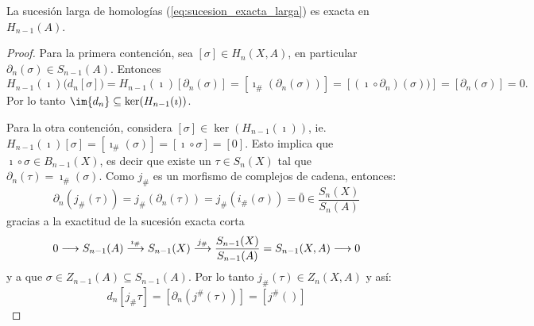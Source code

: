 \begin{ejercicio}\label{ej:66}
  La sucesi\'on larga de homolog\'ias (\ref{eq:sucesion_exacta_larga}) es exacta en $H_{n-1}(A)$.
\end{ejercicio}
\begin{proof}%
  Para la primera contenci\'on, sea $[\sigma]\in H_n(X,A)$, en particular $\partial_n(\sigma)\in S_{n-1}(A)$.
  Entonces
  \[
    H_{n-1}(\imath)\big( d_n[\sigma] \big)=
    H_{n-1}(\imath)[\partial_n(\sigma)]=
    [\imath_{\#}(\partial_n(\sigma))]=
    [(\imath\circ\partial_n)(\sigma))]=
    [\partial_n(\sigma)]=0.
  \]
  Por lo tanto $\im{d_n}\subseteq\ker(H_{n-1}(\imath))$.

  Para la otra contenci\'on, considera $[\sigma]\in\ker(H_{n-1}(\imath))$, ie.
  $H_{n-1}(\imath)[\sigma]=[\imath_{\#}(\sigma)]=[\imath\circ\sigma]=[0]$. Esto implica que $\imath\circ\sigma\in B_{n-1}(X)$,
  es decir que existe un $\tau\in S_n(X)$ tal que $\partial_n(\tau)=\imath_{\#}(\sigma)$. 
  Como $j_{\#}$ es un morfismo de complejos de cadena, entonces:
  \[
    \partial_n (j_{\#}(\tau))=j_{\#}(\partial_n(\tau))=j_{\#}(i_{\#}(\sigma))=\bar{0}\in\frac{S_n(X)}{S_n(A)}
  \]
  gracias a la exactitud de la sucesi\'on exacta corta
  \[
    0 \longrightarrow S_{n-1}(A) \overset{\imath_{\#}}{\longrightarrow} S_{n-1}(X) \overset{j_{\#}}{\longrightarrow} \frac{S_{n-1}(X)}{S_{n-1}(A)}=S_{n-1}(X,A) \longrightarrow 0
  \]
  y a que $\sigma\in Z_{n-1}(A)\subseteq S_{n-1}(A)$. Por lo tanto $j_{\#}(\tau)\in Z_n(X,A)$ y as\'i:
  \[
    d_n[j_{\#}\tau]=[\partial_n(j^{\#}(\tau))]=[j^{\#}()]
  \]
\end{proof}%

